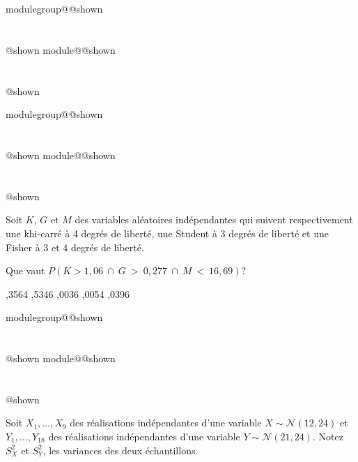 \documentclass{Evaluation}
\makeatletter
\newcommand{\currentmodulekey}{}
\newcommand{\currentmoduletitle}{}
\newcommand{\currentgroupkey}{}
\newcommand{\currentgrouptitle}{}
\newcommand{\showmoduleifneeded}{%
  \ifx\currentgroupkey\empty\else
    \expandafter\ifx\csname modulegroup@\currentgroupkey @shown\endcsname\relax
      \section*{\currentgrouptitle}%
      \expandafter\gdef\csname modulegroup@\currentgroupkey @shown\endcsname{1}%
    \fi
  \fi
  \expandafter\ifx\csname module@\currentmodulekey @shown\endcsname\relax
    \section*{\currentmoduletitle}%
    \expandafter\gdef\csname module@\currentmodulekey @shown\endcsname{1}%
  \fi
}
\newenvironment{H23}{\showmoduleifneeded}{}
\newenvironment{A24}{\showmoduleifneeded}{}
\makeatother
\begin{document}
\begin{questions}
\begin{A24}
\end{A24}

\begin{H23}
\question {} %
Soit $K$, $G$ et $M$ des variables aléatoires indépendantes qui suivent respectivement une khi-carré à 4 degrés de liberté, une Student à 3 degrés de liberté et une Fisher à 3 et 4 degrés de liberté.

Que vaut $P(K>1,06~\cap~G~>~0,277~\cap~M~<~16,69)$?

\begin{oneparcheckboxes}
		,3564
		,5346
		,0036
		,0054
		,0396
\end{oneparcheckboxes}
\end{H23}

\begin{A24}
\question {} %
Soit $X_1,\hdots,X_9$ des réalisations indépendantes d'une variable $X\sim\mathcal{N}(12, 24)$ et $Y_1,\hdots,Y_{18}$ des réalisations indépendantes d'une variable $Y\sim\mathcal{N}(21, 24)$.
Notez $S_X^2$ et $S_Y^2$, les variances des deux échantillons.


\end{A24}
\end{questions}
\end{document}

